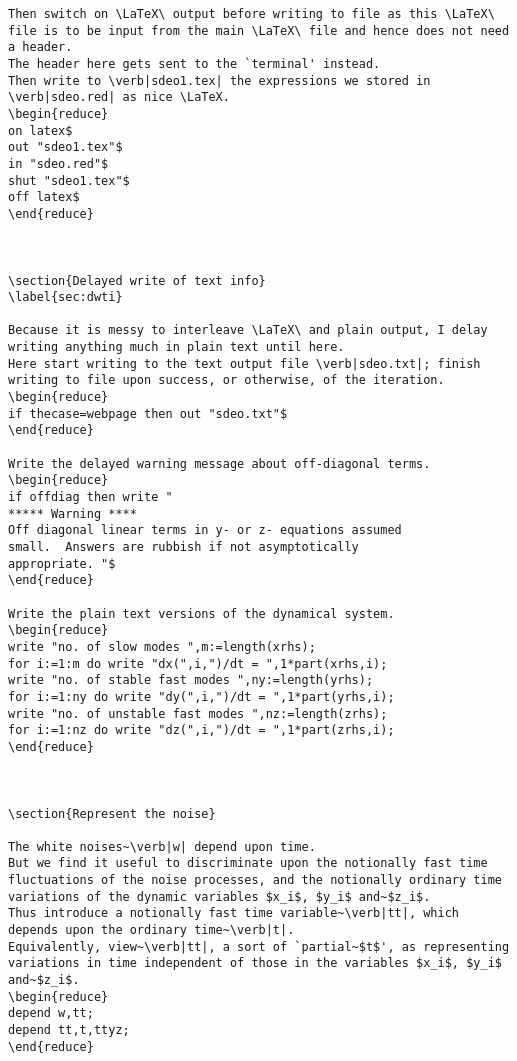 \documentclass[11pt,a5paper]{article}
\begin{document}
\begin{reduce}
\begin{verbatim}
Then switch on \LaTeX\ output before writing to file as this \LaTeX\ file is to be input from the main \LaTeX\ file and hence does not need a header.
The header here gets sent to the `terminal' instead.
Then write to \verb|sdeo1.tex| the expressions we stored in \verb|sdeo.red| as nice \LaTeX.
\begin{reduce}
on latex$
out "sdeo1.tex"$
in "sdeo.red"$
shut "sdeo1.tex"$
off latex$
\end{reduce}



\section{Delayed write of text info}
\label{sec:dwti}

Because it is messy to interleave \LaTeX\ and plain output, I delay writing anything much in plain text until here.
Here start writing to the text output file \verb|sdeo.txt|; finish writing to file upon success, or otherwise, of the iteration.
\begin{reduce}
if thecase=webpage then out "sdeo.txt"$
\end{reduce}

Write the delayed warning message about off-diagonal terms.
\begin{reduce}
if offdiag then write "
***** Warning ****
Off diagonal linear terms in y- or z- equations assumed
small.  Answers are rubbish if not asymptotically
appropriate. "$
\end{reduce}

Write the plain text versions of the dynamical system.
\begin{reduce}
write "no. of slow modes ",m:=length(xrhs);
for i:=1:m do write "dx(",i,")/dt = ",1*part(xrhs,i);
write "no. of stable fast modes ",ny:=length(yrhs);
for i:=1:ny do write "dy(",i,")/dt = ",1*part(yrhs,i);
write "no. of unstable fast modes ",nz:=length(zrhs);
for i:=1:nz do write "dz(",i,")/dt = ",1*part(zrhs,i);
\end{reduce}



\section{Represent the noise}

The white noises~\verb|w| depend upon time.
But we find it useful to discriminate upon the notionally fast time fluctuations of the noise processes, and the notionally ordinary time variations of the dynamic variables $x_i$, $y_i$ and~$z_i$.
Thus introduce a notionally fast time variable~\verb|tt|, which depends upon the ordinary time~\verb|t|.
Equivalently, view~\verb|tt|, a sort of `partial~$t$', as representing variations in time independent of those in the variables $x_i$, $y_i$ and~$z_i$.
\begin{reduce}
depend w,tt;
depend tt,t,ttyz;
\end{reduce}


\end{verbatim}
\end{reduce}
\end{document}
